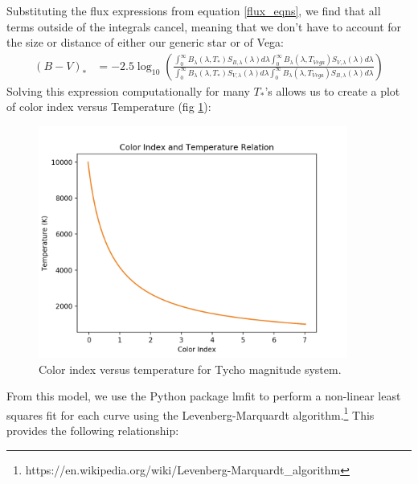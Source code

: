 \documentclass[]{DINOReportMemo}
\begin{document}
Substituting the flux expressions from equation \ref{flux_eqns}, we find that all terms outside of the integrals cancel, meaning that we don't have to account for the size or distance of either our generic star or of Vega:
\begin{equation}\label{BV_T_rel}
\begin{split} 
    (B-V)_* &= -2.5\log_{10}\left(\frac{
    \int_0^\infty  B_{\lambda}(\lambda,T_*)S_{B,\lambda}(\lambda)d\lambda
    \int_0^\infty  B_{\lambda}(\lambda,T_{Vega})S_{V,\lambda}(\lambda)d\lambda
    }{
    \int_0^\infty  B_{\lambda}(\lambda,T_*)S_{V,\lambda}(\lambda)d\lambda
    \int_0^\infty  B_{\lambda}(\lambda,T_{Vega})S_{B,\lambda}(\lambda)d\lambda
    }
    \right)
\end{split}
\end{equation}
Solving this expression computationally for many $T_*$'s allows us to create a plot of color index versus Temperature (fig \ref{theory_curve}):

\begin{figure}[h]
\centering
\includegraphics[height=3in]{BV_vs_T}
\caption{Color index versus temperature for Tycho magnitude system.}
\label{theory_curve}
\end{figure}
From this model, we use the Python package lmfit to perform a non-linear least squares fit for each curve using the Levenberg-Marquardt algorithm.\footnote{https://en.wikipedia.org/wiki/Levenberg-Marquardt\_algorithm} This provides the following relationship:
\end{document}
